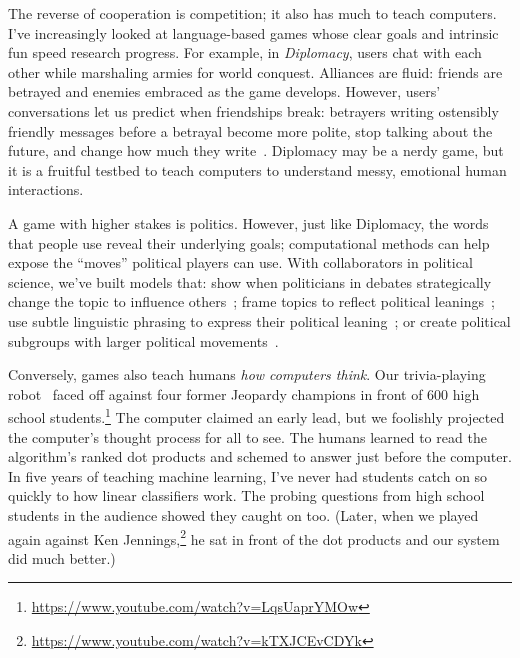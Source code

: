 \documentclass[11pt]{amsart}
\begin{document}
The reverse of cooperation is competition; it also has much to teach
computers. I've increasingly looked at language-based games whose clear goals
and intrinsic fun speed research progress.  For example, in \emph{Diplomacy},
users chat with each other while marshaling armies for world conquest.
Alliances are fluid: friends are betrayed and enemies embraced as the game
develops. However, users' conversations let us predict when friendships break:
betrayers writing ostensibly friendly messages before a betrayal become more
polite, stop talking about the future, and change how much they
write~\cite{niculae-15}.  Diplomacy may be a nerdy game, but it is a fruitful
testbed to teach computers to understand messy, emotional human interactions.

A game with higher stakes is politics.  However, just like Diplomacy, the words
that people use reveal their underlying goals; computational methods can help
expose the ``moves'' political players can use.  With collaborators in political
science, we've built models that: show when politicians in debates strategically
change the topic to influence others~\cite{nguyen-12,Nguyen-14b}; frame topics
to reflect political leanings~\cite{nguyen-13:shlda}; use subtle linguistic
phrasing to express their political leaning~\cite{iyyer-14a}; or create
political subgroups with larger political
movements~\cite{Nguyen:Boyd-Graber:Resnik:Miler-2015}.

Conversely, games also teach humans \emph{how computers think}.  Our
trivia-playing robot~\cite{boyd-graber-12,iyyer-14b,iyyer-15} faced off against
four former Jeopardy champions in front of 600 high school
students.\footnote{\url{https://www.youtube.com/watch?v=LqsUaprYMOw}} The
computer claimed an early lead, but we foolishly projected the computer's
thought process for all to see.  The humans learned to read the algorithm's
ranked dot products and schemed to answer just before the computer. In five
years of teaching machine learning, I've never had students catch on so quickly
to how linear classifiers work.  The probing questions from high school students
in the audience showed they caught on too.  (Later, when we played again against
Ken Jennings,\footnote{\url{https://www.youtube.com/watch?v=kTXJCEvCDYk}} he sat
in front of the dot products and our system did much better.)
\end{document}
